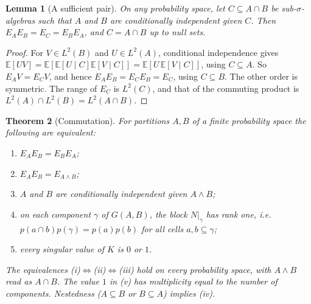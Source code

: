 \documentclass[11pt]{article}
\newtheorem{theorem}{Theorem}[section]
\newtheorem{lemma}[theorem]{Lemma}
\theoremstyle{definition}
\newcommand{\EE}{\mathbb E}
\begin{document}
\begin{lemma}[A sufficient pair]\label{lem:smallC}
On any probability space, let $C\subseteq A\cap B$ be sub-$\sigma$-algebras such that $A$ and $B$ are conditionally independent given
$C$. Then $E_AE_B=E_C=E_BE_A$, and $C=A\cap B$ up to null sets.
\end{lemma}
\begin{proof}
For $V\in L^2(B)$ and $U\in L^2(A)$, conditional independence gives
$\EE[UV]=\EE[\EE[U\mid C]\EE[V\mid C]]=\EE[U\,\EE[V\mid C]]$, using $C\subseteq A$. So $E_AV=E_CV$, and hence $E_AE_B=E_CE_B=E_C$,
using $C\subseteq B$. The other order is symmetric. The range of $E_C$ is $L^2(C)$, and that of the commuting product is
$L^2(A)\cap L^2(B)=L^2(A\cap B)$.
\end{proof}

\begin{theorem}[Commutation]\label{thm:commute}
For partitions $A,B$ of a finite probability space the following are equivalent:
\begin{enumerate}[label=(\roman*)]
\item $E_AE_B=E_BE_A$;
\item $E_AE_B=E_{A\wedge B}$;
\item $A$ and $B$ are conditionally independent given $A\wedge B$;
\item on each component $\gamma$ of $G(A,B)$, the block $N|_\gamma$ has rank one, i.e.\ $p(a\cap b)p(\gamma)=p(a)p(b)$ for all cells
  $a,b\subseteq\gamma$;
\item every singular value of $K$ is $0$ or $1$.
\end{enumerate}
The equivalences (i)$\Leftrightarrow$(ii)$\Leftrightarrow$(iii) hold on every probability space, with $A\wedge B$ read as $A\cap B$.
The value $1$ in (v) has multiplicity equal to the number of components. Nestedness ($A\subseteq B$ or $B\subseteq A$) implies (iv).
\end{theorem}
\end{document}
